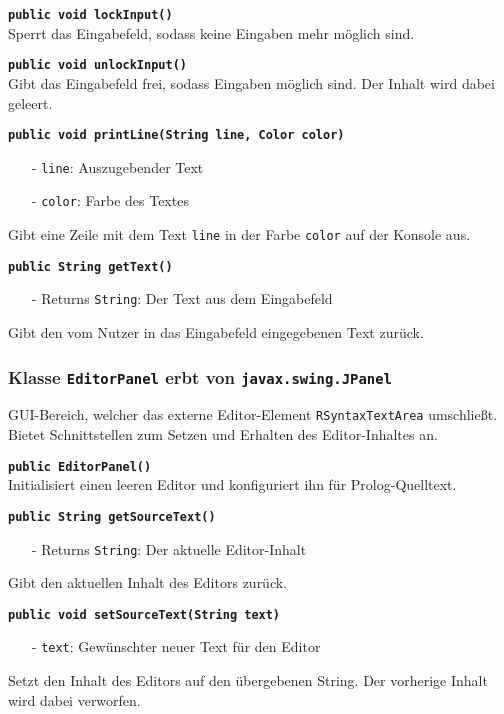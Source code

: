 \documentclass[parskip=full,11pt,twoside]{scrartcl}
\begin{document}
\textbf{\texttt{public void lockInput()}}\\
Sperrt das Eingabefeld, sodass keine Eingaben mehr möglich sind.

\textbf{\texttt{public void unlockInput()}}\\
Gibt das Eingabefeld frei, sodass Eingaben möglich sind. Der Inhalt wird dabei geleert.

\textbf{\texttt{public void printLine(String line, Color color)}}
\begin{itemize}[noitemsep]
	\item[-] \texttt{line}: Auszugebender Text
	\item[-] \texttt{color}: Farbe des Textes
\end{itemize}
Gibt eine Zeile mit dem Text \texttt{line} in der Farbe \texttt{color} auf der Konsole aus.

\textbf{\texttt{public String getText()}}
\begin{itemize}[noitemsep]
	\item[-] Returns \texttt{String}: Der Text aus dem Eingabefeld
\end{itemize}
Gibt den vom Nutzer in das Eingabefeld eingegebenen Text zurück.

\subsubsection{Klasse \texttt{EditorPanel} erbt von \texttt{javax.swing.JPanel}}

GUI-Bereich, welcher das externe Editor-Element \texttt{RSyntaxTextArea} umschließt. Bietet Schnittstellen zum Setzen und Erhalten des Editor-Inhaltes an.

\textbf{\texttt{public EditorPanel()}}\\
Initialisiert einen leeren Editor und konfiguriert ihn für Prolog-Quelltext.

\textbf{\texttt{public String getSourceText()}}
\begin{itemize}[noitemsep]
	\item[-] Returns \texttt{String}: Der aktuelle Editor-Inhalt
\end{itemize}
Gibt den aktuellen Inhalt des Editors zurück.

\textbf{\texttt{public void setSourceText(String text)}}
\begin{itemize}[noitemsep]
	\item[-] \texttt{text}: Gewünschter neuer Text für den Editor
\end{itemize}
Setzt den Inhalt des Editors auf den übergebenen String. Der vorherige Inhalt wird dabei verworfen.
\end{document}
